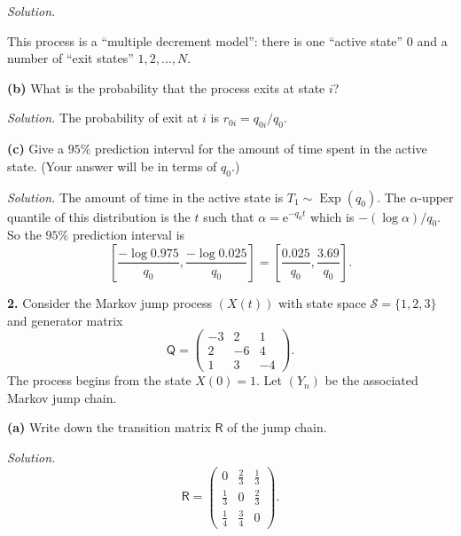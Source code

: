 \documentclass[
  a4paper,
]{article}
\theoremstyle{definition}
\theoremstyle{definition}
\theoremstyle{definition}
\theoremstyle{remark}
\begin{document}
\begin{myanswers}
\emph{Solution.}

\end{myanswers}

This process is a ``multiple decrement model'': there is one ``active state'' 0 and a number of ``exit states'' \(1,2,\dots,N\).

\textbf{(b)} What is the probability that the process exits at state \(i\)?

\begin{myanswers}
\emph{Solution.} The probability of exit at \(i\) is \(r_{0i} = q_{0i}/q_0\).

\end{myanswers}

\textbf{(c)} Give a \(95\%\) prediction interval for the amount of time spent in the active state. (Your answer will be in terms of \(q_0\).)

\begin{myanswers}
\emph{Solution.}
The amount of time in the active state is \(T_1 \sim \operatorname{Exp}(q_0)\). The \(\alpha\)-upper quantile of this distribution is the \(t\) such that \(\alpha = \mathrm{e}^{-q_0 t}\) which is \(-(\log\alpha)/q_0\). So the \(95\%\) prediction interval is
\[ \left[ \frac{-\log0.975}{q_0} , \frac{-\log0.025}{q_0} \right] = \left[ \frac{0.025}{q_0}, \frac{3.69}{q_0} \right] .              \]

\end{myanswers}

\textbf{2.} Consider the Markov jump process \((X(t))\) with state space \(\mathcal S = \{1,2,3\}\) and generator matrix
\[ \mathsf Q = \begin{pmatrix} -3 & 2 & 1 \\ 2 & -6 & 4 \\ 1 & 3 & -4 \end{pmatrix} . \]
The process begins from the state \(X(0) = 1\).
Let \((Y_n)\) be the associated Markov jump chain.

\textbf{(a)} Write down the transition matrix \(\mathsf R\) of the jump chain.

\begin{myanswers}
\emph{Solution.}
\[ \mathsf R = \begin{pmatrix} 0 & \frac23 & \frac13 \\[0.5ex] \frac13 & 0 & \frac23 \\[0.5ex] \frac14 & \frac34 & 0 \end{pmatrix} . \]

\end{myanswers}
\end{document}
